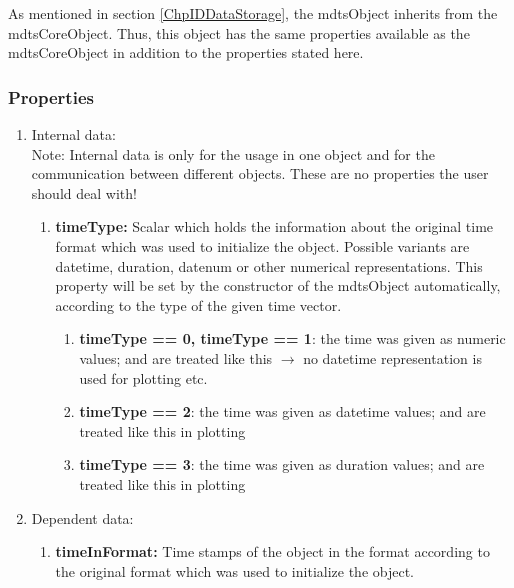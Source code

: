 \documentclass[a4]{scrreprt}
\begin{document}
As mentioned in section \ref{ChpIDDataStorage}, the mdtsObject inherits from the mdtsCoreObject. Thus, this object has the same properties available as the mdtsCoreObject in addition to the properties stated here.

\subsubsection{Properties}

\begin{enumerate}
	
	\item Internal data:\\
	Note: Internal data is only for the usage in one object and for the communication between different objects. These are no properties the user should deal with!
	
		\begin{enumerate}
			
			\item \textbf{timeType:} Scalar which holds the information about the original time format which was used to initialize the object. Possible variants are datetime, duration, datenum or other numerical representations. This property will be set by the constructor of the mdtsObject automatically, according to the type of the given time vector.
			\begin{enumerate}
				\item \textbf{timeType == 0, timeType == 1}: the time was given as numeric values; and are treated like this $\rightarrow$ no datetime representation is used for plotting etc.
				\item \textbf{timeType == 2}: the time was given as datetime values; and are treated like this in plotting
				\item \textbf{timeType == 3}: the time was given as duration values; and are treated like this in plotting
			\end{enumerate}		
		\end{enumerate}
	
	\item Dependent data:
	
		\begin{enumerate}
			
			\item \textbf{timeInFormat:} Time stamps of the object in the format according to the original format which was used to initialize the object. 
			
		\end{enumerate}
	
\end{enumerate}
\end{document}
